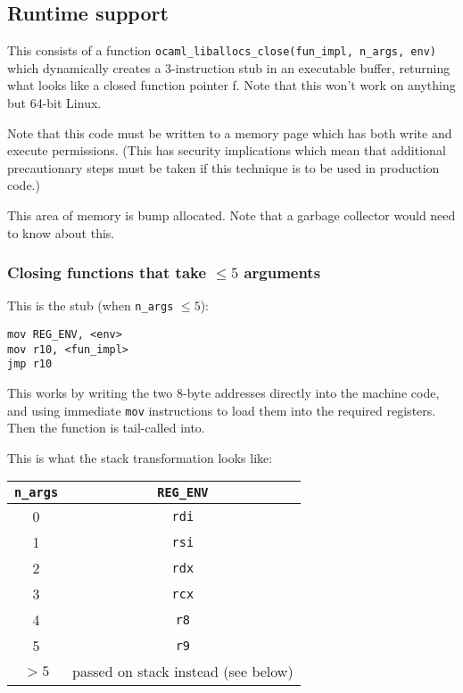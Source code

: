 \documentclass[12pt,a4paper,twoside,openright]{report}
\begin{document}
\subsection{Runtime support}

This consists of a function \lstinline{ocaml_liballocs_close(fun_impl, n_args, env)}
which dynamically creates a 3-instruction stub in an executable buffer,
returning what looks like a closed function pointer f. Note that this won't work on anything but 64-bit Linux.

Note that this code must be written to a memory page which has both write and execute permissions. (This has security implications which mean that additional precautionary steps must be taken if this technique is to be used in production code.)

This area of memory is bump allocated. Note that a garbage collector would need to know about this.

\subsubsection{Closing functions that take $\le 5$ arguments}

This is the stub (when \lstinline{n_args} $\le 5$):

\begin{lstlisting}
mov REG_ENV, <env>
mov r10, <fun_impl>
jmp r10
\end{lstlisting}

This works by writing the two 8-byte addresses directly into the machine code, and using immediate \lstinline{mov} instructions to load them into the required registers. Then the function is tail-called into.

This is what the stack transformation looks like: %

\begin{tabular}{ c | c }
  \lstinline!n_args! & \lstinline!REG_ENV! \\
  \hline
  0 & \lstinline!rdi! \\
  1 & \lstinline!rsi! \\
  2 & \lstinline!rdx! \\
  3 & \lstinline!rcx! \\
  4 & \lstinline!r8! \\
  5 & \lstinline!r9! \\
  $> 5$ & passed on stack instead (see below) \\
\end{tabular}
\end{document}

